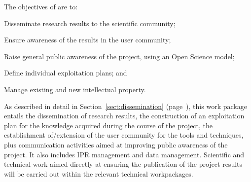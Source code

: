 \addtocounter{wpno}{1}
\begin{Workpackage}{\thewpno}
\WPTitle{\wpname{\thewpno}}


\begin{WPObjectives}
The objectives of \theWP{} are to:
\begin{compactitem}
  \item Disseminate research results to the scientific community;
  \item Ensure awareness of the results in the user community;
  \item Raise general public awareness of the \TheProject{} project, using an Open Science model;
  \item Define individual exploitation plans;
  and
  \item Manage existing and new intellectual property.
\end{compactitem}
\end{WPObjectives}

\begin{WPDescription}
As described in detail in Section~\ref{sect:dissemination} (page~\pageref{sect:dissemination}), this work package entails the dissemination of research results, the construction of an exploitation plan for the knowledge acquired during the course of the \TheProject{} project, 
the establishment of/extension of the user community for the \TheProject{} tools and techniques,
plus communication activities aimed at improving public awareness of the \TheProject{} project.
It also includes IPR management and data management.
Scientific and technical work aimed directly at ensuring the publication of the project results will be carried out within the relevant technical workpackages.
\end{WPDescription}

\begin{Task}




\end{Task}
\end{Workpackage}
